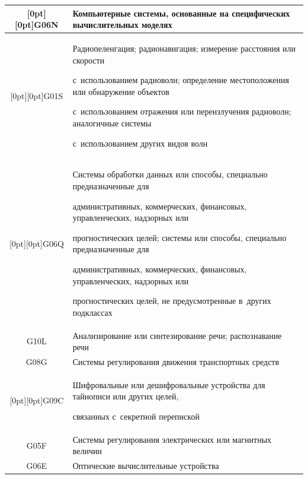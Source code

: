 \begin{table}[b]
\begin{center}
\begin{tabular}{|c|p{95mm}|}
\hline


\multicolumn{1}{|c|}{\raisebox{-6pt}[0pt][0pt]{G06N}}&Компьютерные системы, основанные на специфических вы\-чис\-ли\-тель\-ных моделях\\


\hline


\multicolumn{1}{|c|}{\raisebox{-22pt}[0pt][0pt]{G01S}}&Радиопеленгация; радионавигация; измерение расстояния или скорости 


с~использованием радиоволн; определение местоположения или обнаружение объектов 


с~использованием отражения или переизлучения радиоволн; аналогичные системы 


с~использованием других видов волн\\


\hline


\multicolumn{1}{|c|}{\raisebox{-30pt}[0pt][0pt]{G06Q}}&Системы обработки данных или способы, специально предназначенные для 


административных, коммерческих, финансовых, управленческих, надзорных или 


прогностических целей; системы или способы, специально предназначенные для 


административных, коммерческих, финансовых, управленческих, надзорных или 


прогностических целей, не предусмотренные в~других подклассах\\


\hline


G10L&Анализирование или синтезирование речи; распознавание речи\\


\hline


G08G&Системы регулирования движения транспортных средств\\


\hline


\multicolumn{1}{|c|}{\raisebox{-6pt}[0pt][0pt]{G09C}}&Шифровальные или дешифровальные устройства для тайнописи или других целей, 


связанных с~секретной перепиской\\


\hline


G05F&Системы регулирования электрических или магнитных величин\\


\hline


G06E&Оптические вычислительные устройства\\



\end{tabular}
\end{center}
\end{table}
